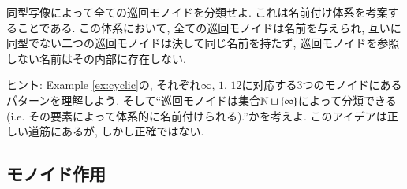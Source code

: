 \begin{exercise}[巡回モノイドの分類]\label{exc:classify cyclic}


同型写像によって全ての巡回モノイドを分類せよ. これは名前付け体系を考案することである. この体系において, 全ての巡回モノイドは名前を与えられ, 互いに同型でない二つの巡回モノイドは決して同じ名前を持たず, 巡回モノイドを参照しない名前はその内部に存在しない. 


ヒント: Example \ref{ex:cyclic}の, それぞれ$\infty$, $1$, $12$に対応する3つのモノイドにあるパターンを理解しよう. そして``巡回モノイドは集合${\mathbb N}\sqcup\{\infty\}$によって分類できる(i.e. その要素によって体系的に名前付けられる).''かを考えよ. このアイデアは正しい道筋にあるが, しかし正確ではない.
\end{exercise}


\subsection{モノイド作用}

